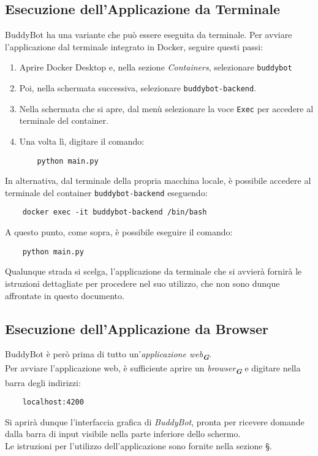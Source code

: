 \subsection{Esecuzione dell'Applicazione da Terminale}
BuddyBot ha una variante che può essere eseguita da terminale.
Per avviare l'applicazione dal terminale integrato in Docker, seguire questi passi:
\begin{enumerate}
    \item Aprire Docker Desktop e, nella sezione \textit{Containers}, selezionare \texttt{buddybot}
    \item Poi, nella schermata successiva, selezionare \texttt{buddybot-backend}.
    \item Nella schermata che si apre, dal menù selezionare la voce \texttt{Exec} per accedere al terminale del container.
    \item Una volta lì, digitare il comando:
    \begin{verbatim}
    python main.py
    \end{verbatim}
\end{enumerate}

In alternativa, dal terminale della propria macchina locale, è possibile accedere al terminale del container 
\texttt{buddybot-backend} eseguendo:
\begin{verbatim}
    docker exec -it buddybot-backend /bin/bash
\end{verbatim}
A questo punto, come sopra, è possibile eseguire il comando:
\begin{verbatim}
    python main.py
\end{verbatim}

Qualunque strada si scelga, l'applicazione da terminale che si avvierà fornirà le istruzioni dettagliate per procedere nel suo
utilizzo, che non sono dunque affrontate in questo documento.

\subsection{Esecuzione dell'Applicazione da Browser}
BuddyBot è però prima di tutto un'\emph{applicazione web}\textsubscript{\textbf{\textit{G}}}.\\
Per avviare l'applicazione web, è sufficiente aprire un \emph{browser}\textsubscript{\textbf{\textit{G}}} e digitare nella barra
degli indirizzi:
\begin{verbatim}
    localhost:4200
\end{verbatim}
Si aprirà dunque l'interfaccia grafica di \textit{BuddyBot}, pronta per ricevere domande dalla barra di input visibile nella parte
inferiore dello schermo.\\
Le istruzioni per l'utilizzo dell'applicazione sono fornite nella sezione \S{}.
